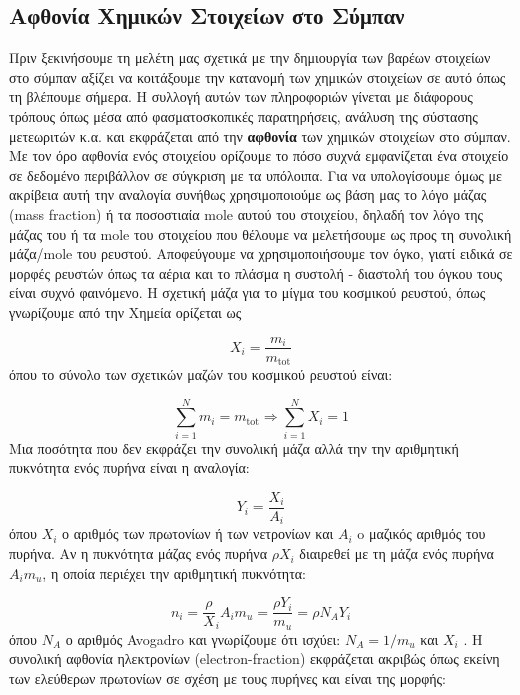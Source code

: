 \subsection{Αφθονία Χημικών Στοιχείων στο Σύμπαν}
Πριν ξεκινήσουμε τη μελέτη μας σχετικά με την δημιουργία των βαρέων στοιχείων στο σύμπαν αξίζει να κοιτάξουμε την κατανομή των χημικών στοιχείων σε αυτό όπως τη βλέπουμε σήμερα. Η συλλογή αυτών των πληροφοριών γίνεται με διάφορους τρόπους όπως μέσα από φασματοσκοπικές παρατηρήσεις, ανάλυση της σύστασης μετεωριτών κ.α. και εκφράζεται από την \textbf{αφθονία} των χημικών στοιχείων στο σύμπαν. Με τον όρο αφθονία ενός στοιχείου ορίζουμε το πόσο συχνά εμφανίζεται ένα στοιχείο σε δεδομένο περιβάλλον σε σύγκριση με τα υπόλοιπα. Για να υπολογίσουμε όμως με ακρίβεια αυτή την αναλογία συνήθως χρησιμοποιούμε ως βάση μας το λόγο μάζας (mass fraction) ή τα ποσοστιαία mole αυτού του στοιχείου, δηλαδή τον λόγο της μάζας του ή τα mole του στοιχείου που θέλουμε να μελετήσουμε ως προς τη συνολική μάζα/mole του ρευστού. Αποφεύγουμε να χρησιμοποιήσουμε τον όγκο, γιατί ειδικά σε μορφές ρευστών όπως τα αέρια και το πλάσμα η συστολή - διαστολή του όγκου τους είναι συχνό φαινόμενο. Η σχετική μάζα για το μίγμα του κοσμικού ρευστού, όπως γνωρίζουμε από την Χημεία ορίζεται ως

\begin{equation}
X_{i}=\frac{m_{i}}{m_{\text{tot}}}
\end{equation}
όπου το σύνολο των σχετικών μαζών του κοσμικού ρευστού είναι:

\begin{equation}
\sum\limits_{i=1}^N m_{i} = m_{\text{tot}} \Rightarrow \sum\limits_{i=1}^N X_{i} =1
\end{equation}
Μια ποσότητα που δεν εκφράζει την συνολική μάζα αλλά την την αριθμητική πυκνότητα ενός πυρήνα είναι η αναλογία:

\begin{equation}
Y_{i}= \frac{X_{i}}{A_{i}}
\end{equation}
όπου $X_i$ ο αριθμός των πρωτονίων ή των νετρονίων και $A_{i}$ o μαζικός αριθμός του πυρήνα. Αν η πυκνότητα μάζας ενός πυρήνα $\rho X_{i}$ διαιρεθεί με τη μάζα ενός πυρήνα $A_{i} m_{u}$, η οποία περιέχει την αριθμητική πυκνότητα:

\begin{equation}
n_{i}= \frac{\rho}X_{i}{A_{i}m_{u}}= \frac{\rho Y_{i}}{m_{u}}=\rho N_{A} Y_{i}
\end{equation}
όπου $N_{A}$ ο αριθμός Avogadro και γνωρίζουμε ότι ισχύει: $N_{A}= 1/ m_{u}$ και $X_{i}$ . Η συνολική αφθονία ηλεκτρονίων (electron-fraction) εκφράζεται ακριβώς όπως εκείνη των ελεύθερων πρωτονίων σε σχέση με τους πυρήνες και είναι της μορφής:

